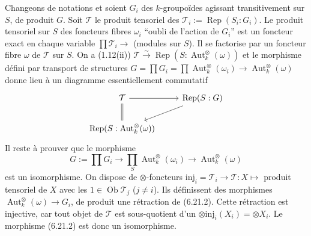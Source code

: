\documentclass[12pt,a4paper]{article}
\theoremstyle{plain}
\theoremstyle{definition}
\theoremstyle{remark}
\DeclareMathOperator{\Aut}{Aut}
\DeclareMathOperator{\Rep}{Rep}
\DeclareMathOperator{\Ob}{Ob}
\begin{document}
Changeons de notations et soient $G_i$ des $k$-groupoïdes agissant transitivement sur $S$, de produit $G$. Soit $\mathcal{T}$ le produit tensoriel des $\mathcal{T}_i := \Rep(S_i:G_i)$. Le produit tensoriel sur $S$ des foncteurs fibres $\omega_i$ ``oubli de l'action de $G_i$'' est un foncteur exact en chaque variable $\prod \mathcal{T}_i \to$ (modules sur $S$). Il se factorise par un foncteur fibre $\omega$ de $\mathcal{T}$ sur $S$. On a (1.12(ii)) $\mathcal{T} \xrightarrow{\sim} \Rep(S:\Aut^\otimes_k(\omega))$ et le morphisme défini par transport de structures $G = \prod G_i = \prod \Aut^\otimes_k(\omega_i) \to \Aut^\otimes_k(\omega)$ donne lieu à un diagramme essentiellement commutatif
\[
\begin{tikzcd}
\mathcal{T} \arrow[r] \arrow[d, equal] & \Rep(S:G) \arrow[ld] \\
\Rep(S:\Aut^\otimes_k(\omega)) &
\end{tikzcd}
\]
Il reste à prouver que le morphisme
\begin{equation}\label{eq:6.21.2}
G := \prod G_i \to \prod_S \Aut^\otimes_k(\omega_i) \to \Aut^\otimes_k(\omega)
\end{equation}
est un isomorphisme. On dispose de $\otimes$-foncteurs $\mathrm{inj}_i = \mathcal{T}_i \to \mathcal{T} : X \mapsto$ produit tensoriel de $X$ avec les $1 \in \Ob\mathcal{T}_j$ ($j \neq i$). Ils définissent des morphismes $\Aut^\otimes_k(\omega) \to G_i$, de produit une rétraction de (6.21.2). Cette rétraction est injective, car tout objet de $\mathcal{T}$ est sous-quotient d'un $\otimes \mathrm{inj}_i(X_i) = \otimes X_i$. Le morphisme (6.21.2) est donc un isomorphisme.
\end{document}
